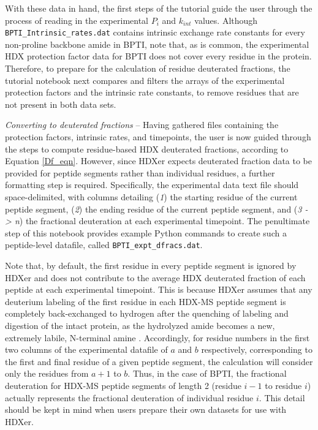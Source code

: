 \documentclass[9pt,tutorial]{livecoms}
\begin{document}
With these data in hand, the first steps of the tutorial guide the user through the process of reading in the experimental $P_i$ and $k_{int}$ values.
Although \texttt{BPTI\_Intrinsic\_rates.dat} contains intrinsic exchange rate constants for every non-proline backbone amide in BPTI, note that, as is common, the experimental HDX protection factor data for BPTI does not cover every residue in the protein. 
Therefore, to prepare for the calculation of residue deuterated fractions, the tutorial notebook next compares and filters the arrays of the experimental protection factors and the intrinsic rate constants, to remove residues that are not present in both data sets.

\noindent
\textit{Converting to deuterated fractions} -- Having gathered files containing the protection factors, intrinsic rates, and timepoints, the user is now guided through the steps to compute residue-based HDX deuterated fractions, according to Equation \ref{Df_eqn}.
However, since HDXer expects deuterated fraction data to be provided for peptide segments rather than individual residues, a further formatting step is required.
Specifically, the experimental data text file should space-delimited, with columns detailing (\textit{1}) the starting residue of the current peptide segment, (\textit{2}) the ending residue of the current peptide segment, and (\textit{3 -> n}) the fractional deuteration at each experimental timepoint.
The penultimate step of this notebook provides example Python commands to create such a peptide-level datafile, called \texttt{BPTI\_expt\_dfracs.dat}.

Note that, by default, the first residue in every peptide segment is ignored by HDXer and does not contribute to the average HDX deuterated fraction of each peptide at each experimental timepoint.
This is because HDXer assumes that any deuterium labeling of the first residue in each HDX-MS peptide segment is completely back-exchanged to hydrogen after the quenching of labeling and digestion of the intact protein, as the hydrolyzed amide becomes a new, extremely labile, N-terminal amine \cite{Bai1993, Walters2012}.
Accordingly, for residue numbers in the first two columns of the experimental datafile of $a$ and $b$ respectively, corresponding to the first and final residue of a given peptide segment, the calculation will consider only the residues from $a+1$ to $b$.
Thus, in the case of BPTI, the fractional deuteration for HDX-MS peptide segments of length 2 (residue $i-1$ to residue $i$) actually represents the fractional deuteration of individual residue $i$.
This detail should be kept in mind when users prepare their own datasets for use with HDXer.
\end{document}
